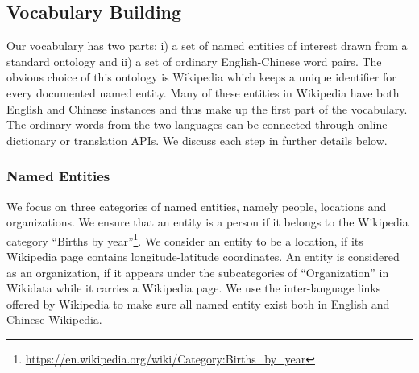 


\subsection{Vocabulary Building}
\label{sec:vocab}
Our vocabulary has two parts: i) a set of named entities of interest
drawn from a standard ontology and ii) a set of ordinary English-Chinese
word pairs. The obvious choice of this ontology is Wikipedia which keeps a unique identifier for every documented named entity.
Many of these entities in Wikipedia have both English and Chinese instances and thus
make up the first part of the vocabulary.
The ordinary words from
the two languages can be connected through online dictionary or translation APIs.
We discuss each step in further details below.


\subsubsection{Named Entities}
We focus on three categories of named entities, namely people, locations and
organizations.
We ensure that an entity is a person if it belongs to the Wikipedia category
``Births by year''\footnote{\url{https://en.wikipedia.org/wiki/Category:Births_by_year}}.
We consider an entity to be a location, if its Wikipedia page contains
longitude-latitude coordinates. An entity is considered as an organization,
if it appears under the subcategories of ``Organization'' in Wikidata while
it carries a Wikipedia page.
We use the inter-language links offered by Wikipedia to make sure all named entity exist both in English and Chinese Wikipedia.

